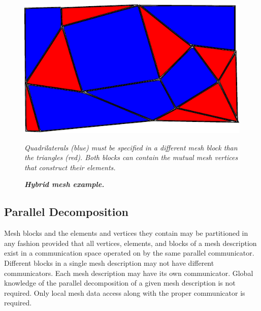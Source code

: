 \documentclass[letterpaper,12pt]{article}
\begin{document}
\begin{figure}[htpb!]
  \centering \includegraphics[width=5in]{hybrid_mesh.pdf}
  \caption{\bf \sl Hybrid mesh example.} {\sl Quadrilaterals (blue)
    must be specified in a different mesh block than the triangles
    (red). Both blocks can contain the mutual mesh vertices that
    construct their elements.}
  \label{fig:hybrid_mesh}
\end{figure}

\subsection{Parallel Decomposition}\label{subsec:mesh_decomp}
Mesh blocks and the elements and vertices they contain may be
partitioned in any fashion provided that all vertices, elements, and
blocks of a mesh description exist in a communication space operated
on by the same parallel communicator. Different blocks in a single
mesh description may not have different communicators. Each mesh
description may have its own communicator. Global knowledge of the
parallel decomposition of a given mesh description is not
required. Only local mesh data access along with the proper
communicator is required.

\clearpage

\end{document}

